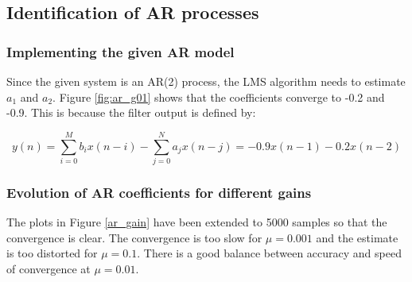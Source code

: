\documentclass{article}
\begin{document}
\pagebreak

\subsection{Identification of AR processes}

\subsubsection{Implementing the given AR model}

Since the given system is an AR(2) process, the LMS algorithm needs to estimate $a_1$ and $a_2$. Figure \ref{fig:ar_g01} shows that the coefficients converge to -0.2 and -0.9. This is because the filter output is defined by:

\begin{equation*}
y(n)=\sum_{i=0}^M b_i x(n-i) - \sum_{j=0}^N a_j x(n-j) = -0.9x(n-1) - 0.2x(n-2)
\end{equation*}


\subsubsection{Evolution of AR coefficients for different gains}

The plots in Figure \ref{ar_gain} have been extended to 5000 samples so that the convergence is clear. The convergence is too slow for $\mu=0.001$ and the estimate is too distorted for $\mu=0.1$. There is a good balance between accuracy and speed of convergence at $\mu=0.01$.
\end{document}

